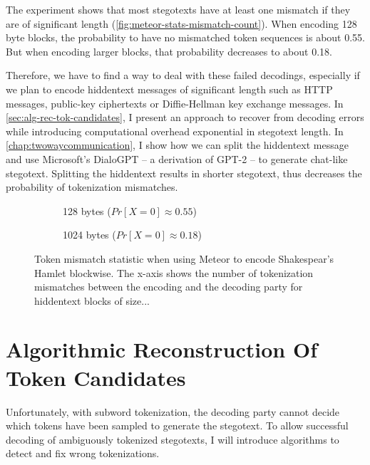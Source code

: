 The experiment shows that most stegotexts have at least one mismatch if they are of significant length (\autoref{fig:meteor-stats-mismatch-count}).
When encoding 128 byte blocks, the probability to have no mismatched token sequences is about 0.55.
But when encoding larger blocks, that probability decreases to about 0.18.

Therefore, we have to find a way to deal with these failed decodings, especially if we plan to encode hiddentext messages of significant length such as HTTP messages, public-key ciphertexts or Diffie-Hellman key exchange messages.
In \autoref{sec:alg-rec-tok-candidates}, I present an approach to recover from decoding errors while introducing computational overhead exponential in stegotext length. 
In \autoref{chap:twowaycommunication}, I show how we can split the hiddentext message and use Microsoft's DialoGPT -- a derivation of GPT-2 -- to generate chat-like stegotext.
Splitting the hiddentext results in shorter stegotext, thus decreases the probability of tokenization mismatches.

\begin{figure}[htbp]%
	\begin{subfigure}{.5\textwidth}%
		\centering%
	    \resizebox{0.8\linewidth}{!}{%
		}%
		\caption{128 bytes ($Pr[X=0] \approx 0.55$)}%
	\end{subfigure}%
	\begin{subfigure}{.5\textwidth}%
		\centering%
	    \resizebox{0.8\linewidth}{!}{%
		}%
		\caption{1024 bytes ($Pr[X=0] \approx 0.18$)}%
	\end{subfigure}%
	\caption{Token mismatch statistic when using Meteor to encode Shakespear's Hamlet blockwise. The x-axis shows the number of tokenization mismatches between the encoding and the decoding party for hiddentext blocks of size...}
	\label{fig:meteor-stats-mismatch-count}	
\end{figure}

\section{Algorithmic Reconstruction Of Token Candidates}
\label{sec:alg-rec-tok-candidates}

Unfortunately, with subword tokenization, the decoding party cannot decide which tokens have been sampled to generate the stegotext.
To allow successful decoding of ambiguously tokenized stegotexts, I will introduce algorithms to detect and fix wrong tokenizations.


